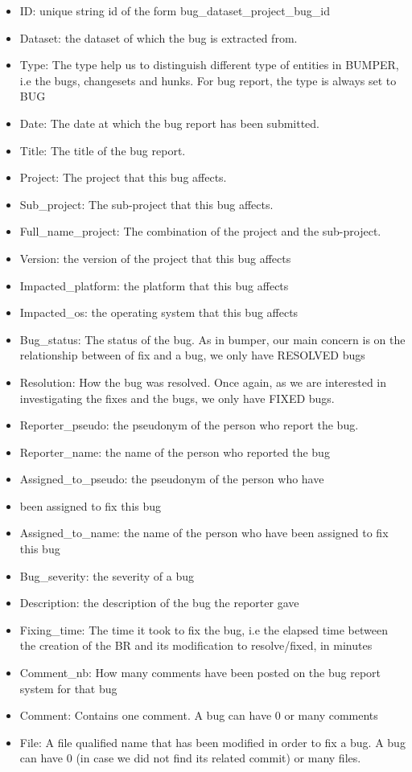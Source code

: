 \begin{itemize}
\item
  ID: unique string id of the form bug\_dataset\_project\_bug\_id
\item
  Dataset: the dataset of which the bug is extracted from.
\item
  Type: The type help us to distinguish different type of entities in
  BUMPER, i.e the bugs, changesets and hunks. For bug report, the type
  is always set to BUG
\item
  Date: The date at which the bug report has been submitted.
\item
  Title: The title of the bug report.
\item
  Project: The project that this bug affects.
\item
  Sub\_project: The sub-project that this bug affects.
\item
  Full\_name\_project: The combination of the project and the
  sub-project.
\item
  Version: the version of the project that this bug affects
\item
  Impacted\_platform: the platform that this bug affects
\item
  Impacted\_os: the operating system that this bug affects
\item
  Bug\_status: The status of the bug. As in bumper, our main concern is
  on the relationship between of fix and a bug, we only have RESOLVED
  bugs
\item
  Resolution: How the bug was resolved. Once again, as we are interested
  in investigating the fixes and the bugs, we only have FIXED bugs.
\item
  Reporter\_pseudo: the pseudonym of the person who report the bug.
\item
  Reporter\_name: the name of the person who reported the bug
\item
  Assigned\_to\_pseudo: the pseudonym of the person who have
\item
  been assigned to fix this bug
\item
  Assigned\_to\_name: the name of the person who have been assigned to
  fix this bug
\item
  Bug\_severity: the severity of a bug
\item
  Description: the description of the bug the reporter gave
\item
  Fixing\_time: The time it took to fix the bug, i.e the elapsed time
  between the creation of the BR and its modification to resolve/fixed,
  in minutes
\item
  Comment\_nb: How many comments have been posted on the bug report
  system for that bug
\item
  Comment: Contains one comment. A bug can have 0 or many comments
\item
  File: A file qualified name that has been modified in order to fix a
  bug. A bug can have 0 (in case we did not find its related commit) or
  many files.
\end{itemize}

